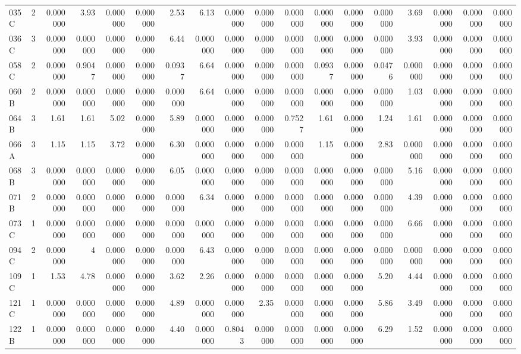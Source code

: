 {\begin{longtable}{lrrrrrrrrrrrrrrrrr}
  035C & 2 & 0.000000 & 3.93 & 0.000000 & 0.000000 & 2.53 & 6.13 & 0.000000 & 0.000000 & 0.000000 & 0.000000 & 0.000000 & 0.000000 & 3.69 & 0.000000 & 0.000000 & 0.000000 \\
  036C & 3 & 0.000000 & 0.000000 & 0.000000 & 0.000000 & 6.44 & 0.000000 & 0.000000 & 0.000000 & 0.000000 & 0.000000 & 0.000000 & 0.000000 & 3.93 & 0.000000 & 0.000000 & 0.000000 \\
  058C & 2 & 0.000000 & 0.9047 & 0.000000 & 0.000000 & 0.0937 & 6.64 & 0.000000 & 0.000000 & 0.000000 & 0.0937 & 0.000000 & 0.0476 & 0.000000 & 0.000000 & 0.000000 & 0.000000 \\
  060B & 2 & 0.000000 & 0.000000 & 0.000000 & 0.000000 & 0.000000 & 6.64 & 0.000000 & 0.000000 & 0.000000 & 0.000000 & 0.000000 & 0.000000 & 1.03 & 0.000000 & 0.000000 & 0.000000 \\
  064B & 3 & 1.61 & 1.61 & 5.02 & 0.000000 & 5.89 & 0.000000 & 0.000000 & 0.000000 & 0.7527 & 1.61 & 0.000000 & 1.24 & 1.61 & 0.000000 & 0.000000 & 0.000000 \\
  066A & 3 & 1.15 & 1.15 & 3.72 & 0.000000 & 6.30 & 0.000000 & 0.000000 & 0.000000 & 0.000000 & 1.15 & 0.000000 & 2.83 & 0.000000 & 0.000000 & 0.000000 & 0.000000 \\
  068B & 3 & 0.000000 & 0.000000 & 0.000000 & 0.000000 & 6.05 & 0.000000 & 0.000000 & 0.000000 & 0.000000 & 0.000000 & 0.000000 & 0.000000 & 5.16 & 0.000000 & 0.000000 & 0.000000 \\
  071B & 2 & 0.000000 & 0.000000 & 0.000000 & 0.000000 & 0.000000 & 6.34 & 0.000000 & 0.000000 & 0.000000 & 0.000000 & 0.000000 & 0.000000 & 4.39 & 0.000000 & 0.000000 & 0.000000 \\
  073C & 1 & 0.000000 & 0.000000 & 0.000000 & 0.000000 & 0.000000 & 0.000000 & 0.000000 & 0.000000 & 0.000000 & 0.000000 & 0.000000 & 0.000000 & 6.66 & 0.000000 & 0.000000 & 0.000000 \\
  094C & 2 & 0.000000 & 4 & 0.000000 & 0.000000 & 0.000000 & 6.43 & 0.000000 & 0.000000 & 0.000000 & 0.000000 & 0.000000 & 0.000000 & 0.000000 & 0.000000 & 0.000000 & 0.000000 \\
  109C & 1 & 1.53 & 4.78 & 0.000000 & 0.000000 & 3.62 & 2.26 & 0.000000 & 0.000000 & 0.000000 & 0.000000 & 0.000000 & 5.20 & 4.44 & 0.000000 & 0.000000 & 0.000000 \\
  121C & 1 & 0.000000 & 0.000000 & 0.000000 & 0.000000 & 4.89 & 0.000000 & 0.000000 & 2.35 & 0.000000 & 0.000000 & 0.000000 & 5.86 & 3.49 & 0.000000 & 0.000000 & 0.000000 \\
  122B & 1 & 0.000000 & 0.000000 & 0.000000 & 0.000000 & 4.40 & 0.000000 & 0.8043 & 0.000000 & 0.000000 & 0.000000 & 0.000000 & 6.29 & 1.52 & 0.000000 & 0.000000 & 0.000000 \\

\end{longtable}}
